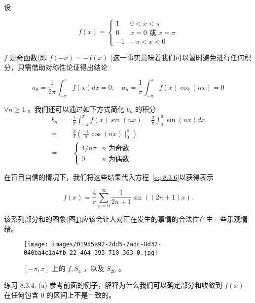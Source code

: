 \begin{Eg}
  \label{eg:8.3.1}
设

\[
f\left( x\right)  = \left\{  \begin{array}{ll} 1 & 0 < x < \pi \\  0 & x = 0\text{ 或 }x = \pi \\   - 1 & - \pi  < x < 0 \end{array}\right.
\]

\(f\) 是奇函数(即 \(f\left( {-x}\right)  =  - f\left( x\right)\) )这一事实意味着我们可以暂时避免进行任何积分，只需借助对称性论证得出结论

\[
{a}_{0} = \frac{1}{2\pi }{\int }_{-\pi }^{\pi }f\left( x\right) {dx} = 0,\quad{a}_{n} = \frac{1}{\pi }{\int }_{-\pi }^{\pi }f\left( x\right) \cos \left( {nx}\right)  = 0
\]

 \(\forall n \geq  1\) 。我们还可以通过如下方式简化 \({b}_{n}\) 的积分
\begin{align*}
{b}_{n} = & \frac{1}{\pi }{\int }_{-\pi }^{\pi }f\left( x\right) \sin \left( {nx}\right)  = \frac{2}{\pi }{\int }_{0}^{\pi }\sin \left( {nx}\right) {dx}\\
= & \frac{2}{\pi }\left( {\frac{-1}{n}\cos \left( {nx}\right) { \mid  }_{0}^{\pi }}\right)\\
= & \left\{  \begin{array}{ll} 4/{n\pi } & n\text{ 为奇数 } \\  0 & n\text{ 为偶数. } \end{array}\right.
\end{align*}

在盲目自信的情况下，我们将这些结果代入方程~\eqref{eq:8.3.6}以获得表示

\[
f\left( x\right)  = \frac{4}{\pi }\mathop{\sum }\limits_{{n = 0}}^{\infty }\frac{1}{{2n} + 1}\sin \left( {\left( {{2n} + 1}\right) x}\right) .
\]

该系列部分和的图象(图\ref{fig:8.2})应该会让人对正在发生的事情的合法性产生一些乐观情绪。

\begin{figure}[htbp]
  \centering
  \texttt{[image: images/01955a92-2dd5-7adc-8d37-040ba4c1a4fb\_22\_464\_393\_710\_363\_0.jpg]}
  \caption{\(\left\lbrack  {-\pi ,\pi }\right\rbrack\) 上的 \(f,{S}_{4}\) ，以及 \({S}_{20}\) 。}
  \label{fig:8.2}
\end{figure}
\end{Eg}

练习 8.3.4. (a) 参考前面的例子，解释为什么我们可以确定部分和收敛到 \(f\left( x\right)\) 在任何包含 0 的区间上不是一致的。

